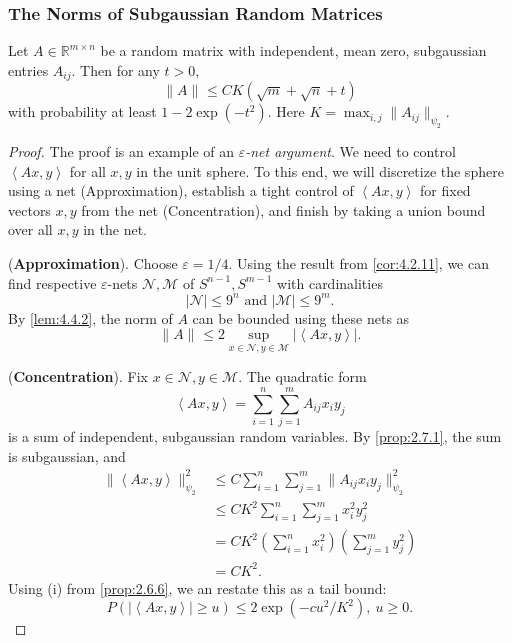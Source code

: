 \subsubsection{The Norms of Subgaussian Random Matrices}
\begin{theorem}[]
\label{thm:4.4.3}
Let $A \in \mathbb{R}^{m \times n}$ be a random matrix with independent, mean zero, subgaussian entries 
$A_{ij}$. Then for any $t > 0$, 
\[ \lVert A \rVert_{} \leq CK(\sqrt{m} + \sqrt{n} + t) \]
with probability at least $1 - 2\exp{(-t^2)}$. Here $K = \max_{i, j} \lVert A_{ij} \rVert_{\psi_2}$.
\end{theorem}

\begin{proof}
The proof is an example of an \textit{$\varepsilon$-net argument}. We need to control 
$\left\langle Ax, y \right\rangle$ for all $x, y$ in the unit sphere. To this end, we will discretize the sphere 
using a net (Approximation), establish a tight control of $\left\langle Ax, y \right\rangle$ for fixed vectors 
$x, y$ from the net (Concentration), and finish by taking a union bound over all $x, y$ in the net.

(\textbf{Approximation}). Choose $\varepsilon = 1/4$. Using the result from \cref{cor:4.2.11}, we can find 
respective $\varepsilon$-nets $\mathcal{N}, \mathcal{M}$ of $S^{n - 1}, S^{m - 1}$ with cardinalities 
\[ |\mathcal{N}| \leq 9^n \text{ and } |\mathcal{M}| \leq 9^m. \]
By \cref{lem:4.4.2}, the norm of $A$ can be bounded using these nets as 
\[ \lVert A \rVert_{} \leq 2 \sup_{x \in \mathcal{N}, y \in \mathcal{M}} 
\left|\left\langle Ax, y \right\rangle\right|. \]

(\textbf{Concentration}). Fix $x \in \mathcal{N}, y \in \mathcal{M}$. The quadratic form 
\[ \left\langle Ax, y \right\rangle = \sum_{i = 1}^{n} \sum_{j = 1}^{m} A_{ij}x_iy_j \]
is a sum of independent, subgaussian random variables. By \cref{prop:2.7.1}, the sum is subgaussian, and 
\begin{align*}
	\lVert \left\langle Ax, y \right\rangle \rVert_{\psi_2}^2 
	&\leq C \sum_{i = 1}^{n} \sum_{j = 1}^{m} \lVert A_{ij}x_iy_j \rVert_{\psi_2}^2 \\
	&\leq CK^2 \sum_{i = 1}^{n} \sum_{j = 1}^{m} x_i^2 y_j^2 \\
	&= CK^2 \left( \sum_{i = 1}^{n} x_i^2 \right) \left( \sum_{j = 1}^{m} y_j^2 \right) \\
	&= CK^2.
\end{align*}
Using (i) from \cref{prop:2.6.6}, we an restate this as a tail bound:
\[ P(\left| \left\langle Ax, y \right\rangle \right| \geq u) 
\leq 2 \exp{(-cu^2 / K^2)}, \ u \geq 0. \]


\end{proof}

